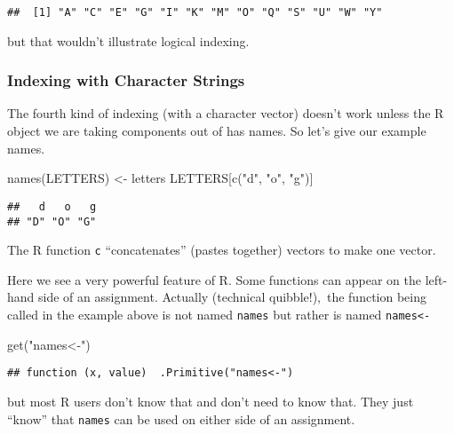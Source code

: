 \documentclass[
]{article}
\newenvironment{Shaded}{\begin{snugshade}}{\end{snugshade}}
\newcommand{\FunctionTok}[1]{\textcolor[rgb]{0.00,0.00,0.00}{#1}}
\newcommand{\NormalTok}[1]{#1}
\newcommand{\OtherTok}[1]{\textcolor[rgb]{0.56,0.35,0.01}{#1}}
\newcommand{\StringTok}[1]{\textcolor[rgb]{0.31,0.60,0.02}{#1}}
\begin{document}
\begin{verbatim}
##  [1] "A" "C" "E" "G" "I" "K" "M" "O" "Q" "S" "U" "W" "Y"
\end{verbatim}

but that wouldn't illustrate logical indexing.

\hypertarget{indexing-with-character-strings}{%
\subsubsection{Indexing with Character
Strings}\label{indexing-with-character-strings}}

The fourth kind of indexing (with a character vector) doesn't work
unless the R object we are taking components out of has names. So let's
give our example names.

\begin{Shaded}
\begin{Highlighting}[]
\FunctionTok{names}\NormalTok{(LETTERS) }\OtherTok{\textless{}{-}}\NormalTok{ letters}
\NormalTok{LETTERS[}\FunctionTok{c}\NormalTok{(}\StringTok{"d"}\NormalTok{, }\StringTok{"o"}\NormalTok{, }\StringTok{"g"}\NormalTok{)]}
\end{Highlighting}
\end{Shaded}

\begin{verbatim}
##   d   o   g 
## "D" "O" "G"
\end{verbatim}

The R function \texttt{c} ``concatenates'' (pastes together) vectors to
make one vector.

Here we see a very powerful feature of R. Some functions can appear on
the left-hand side of an assignment. Actually (technical quibble!),~the
function being called in the example above is not named \texttt{names}
but rather is named \texttt{names\textless{}-}

\begin{Shaded}
\begin{Highlighting}[]
\FunctionTok{get}\NormalTok{(}\StringTok{"names\textless{}{-}"}\NormalTok{)}
\end{Highlighting}
\end{Shaded}

\begin{verbatim}
## function (x, value)  .Primitive("names<-")
\end{verbatim}

but most R users don't know that and don't need to know that. They just
``know'' that \texttt{names} can be used on either side of an
assignment.
\end{document}
